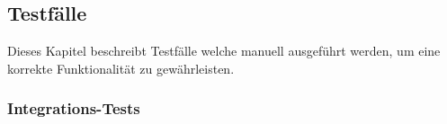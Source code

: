     \clearpage
    \subsection{Testfälle}
    Dieses Kapitel beschreibt Testfälle welche manuell ausgeführt werden, um eine korrekte Funktionalität zu gewährleisten.
    	\subsubsection{Integrations-Tests}
            

        \clearpage
